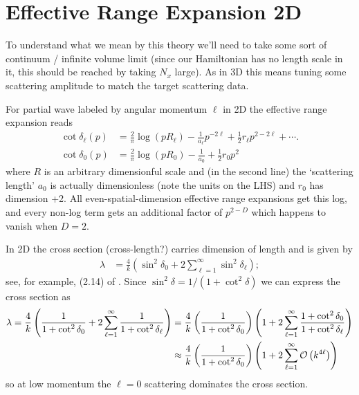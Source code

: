 \section{Effective Range Expansion 2D}

To understand what we mean by this theory we'll need to take some sort of continuum / infinite volume limit (since our Hamiltonian has no length scale in it, this should be reached by taking $N_x$ large).
As in 3D this means tuning some scattering amplitude to match the target scattering data.

For partial wave labeled by angular momentum $\ell$ in 2D the effective range expansion reads
\begin{align}
	\cot \delta_\ell(p)
	&=
			\frac{2}{\pi} \log(p R_\ell)
		-	\frac{1}{a_\ell} p^{-2\ell}
		+	\frac{1}{2} r_\ell p^{2-2\ell}
		+	\cdots.
	\\
	\cot \delta_0(p)
	&=
			\frac{2}{\pi} \log(p R_0)
		-	\frac{1}{a_0}
		+	\frac{1}{2} r_0 p^2
\end{align}
where $R$ is an arbitrary dimensionful scale and (in the second line) the `scattering length' $a_0$ is actually dimensionless (note the units on the LHS) and $r_0$ has dimension +2.
All even-spatial-dimension effective range expansions get this log, and every non-log term gets an additional factor of $p^{2-D}$ which happens to vanish when $D=2$.

In 2D the cross section (cross-length?) carries dimension of length and is given by
\begin{align}
	\lambda &= \frac{4}{k}\left(\sin^2 \delta_0 + 2\sum_{\ell=1}^{\infty} \sin^2 \delta_\ell \right);
\end{align}
see, for example, (2.14) of .
Since $\sin^2 \delta = 1/(1+\cot^2\delta)$ we can express the cross section as
\begin{align}
	\lambda
	=
	\frac{4}{k}\left(\frac{1}{1+\cot^2 \delta_0} + 2\sum_{\ell=1}^{\infty} \frac{1}{1+\cot^2 \delta_\ell} \right)
	&=
	\frac{4}{k}\left(\frac{1}{1+\cot^2 \delta_0}\right) \left(1+ 2\sum_{\ell=1}^{\infty} \frac{1+\cot^2 \delta_0}{1+\cot^2 \delta_\ell} \right)
	\\
	&\approx
	\frac{4}{k}\left(\frac{1}{1+\cot^2 \delta_0}\right) \left(1+ 2\sum_{\ell=1}^{\infty} \mathcal{O}\left(k^{4\ell}\right) \right)
\end{align}
so at low momentum the $\ell=0$ scattering dominates the cross section.

